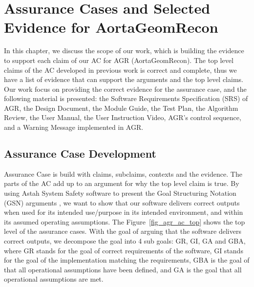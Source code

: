 \chapter{Assurance Cases and Selected Evidence for AortaGeomRecon}

In this chapter, we discuss the scope of our work, which is building the evidence to support each claim of our AC  for AGR (AortaGeomRecon). The top level claims of the AC developed in previous work \cite{scs_ac} is correct and complete, thus we have a list of evidence that can support the arguments and the top level claims. Our work focus on providing the correct evidence for the assurance case, and the following material is presented: the Software Requirements Specification (SRS) of AGR, the Design Document, the Module Guide, the Test Plan, the Algorithm Review,  the User Manual, the User Instruction Video, AGR's control sequence, and a Warning Message implemented  in AGR.

\section{Assurance Case Development}

Assurance Case is build with claims, subclaims, contexts and the evidence. The parts of  the AC  add up  to an argument for why the top level claim is true. By using Astah System Safety software to present the Goal Structuring Notation (GSN) arguments \cite{Astah_2023}\cite{kelly2004goal}, we want to show that our software delivers correct outputs when used for its intended use/purpose in its intended environment, and within its assumed operating assumptions. The Figure~\ref{fig_agr_ac_top} shows the top level of the assurance cases. With the goal of arguing that the software delivers correct outputs, we decompose the goal into 4 sub goals: GR, GI, GA and GBA, where GR stands for the goal of correct requirements of the software, GI stands for the goal of the implementation  matching the requirements, GBA is the goal of  that all  operational assumptions have been defined, and GA is the goal that all operational assumptions are met.


